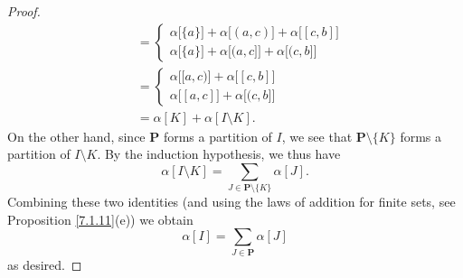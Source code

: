 \begin{proof}
\begin{align*}
                               & = \begin{cases}
                                       \alpha\big[\{a\}\big] + \alpha\big[(a, c)\big] + \alpha\big[[c, b]\big] \\
                                       \alpha\big[\{a\}\big] + \alpha\big[(a, c]\big] + \alpha\big[(c, b]\big]
                                   \end{cases} \\
                               & = \begin{cases}
                                       \alpha\big[[a, c)\big] + \alpha\big[[c, b]\big] \\
                                           \alpha\big[[a, c]\big] + \alpha\big[(c, b]\big]
                                   \end{cases}                        \\
                               & = \alpha[K] + \alpha[I \setminus K].
    \end{align*}
    On the other hand, since \(\mathbf{P}\) forms a partition of \(I\), we see that \(\mathbf{P} \setminus \{K\}\) forms a partition of \(I \setminus K\).
    By the induction hypothesis, we thus have
    \[
        \alpha[I \setminus K] = \sum_{J \in \mathbf{P} \setminus \{K\}} \alpha[J].
    \]
    Combining these two identities (and using the laws of addition for finite sets, see Proposition \ref{7.1.11}(e)) we obtain
    \[
        \alpha[I] = \sum_{J \in \mathbf{P}} \alpha[J]
    \]
    as desired.


\end{proof}
